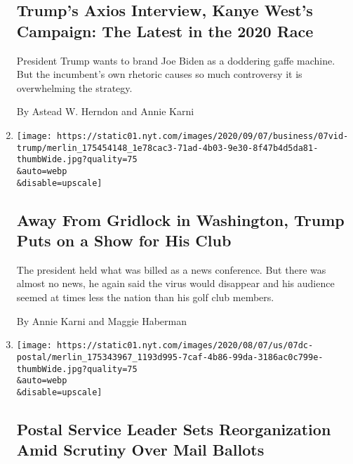 \begin{enumerate}
  \hypertarget{trumps-axios-interview-kanye-wests-campaign-the-latest-in-the-2020-race}{%
  \subsection{Trump's Axios Interview, Kanye West's Campaign: The Latest
  in the 2020
  Race}\label{trumps-axios-interview-kanye-wests-campaign-the-latest-in-the-2020-race}}

  President Trump wants to brand Joe Biden as a doddering gaffe machine.
  But the incumbent's own rhetoric causes so much controversy it is
  overwhelming the strategy.

  By Astead W. Herndon and Annie Karni
\item
  \href{/2020/08/07/us/politics/trump-news-conference-bedminster.html}{}

  \texttt{[image: https://static01.nyt.com/images/2020/09/07/business/07vid-trump/merlin\_175454148\_1e78cac3-71ad-4b03-9e30-8f47b4d5da81-thumbWide.jpg?quality=75\\\&auto=webp\\\&disable=upscale]}

  \hypertarget{away-from-gridlock-in-washington-trump-puts-on-a-show-for-his-club}{%
  \subsection{Away From Gridlock in Washington, Trump Puts on a Show for
  His
  Club}\label{away-from-gridlock-in-washington-trump-puts-on-a-show-for-his-club}}

  The president held what was billed as a news conference. But there was
  almost no news, he again said the virus would disappear and his
  audience seemed at times less the nation than his golf club members.

  By Annie Karni and Maggie Haberman
\item
  \href{/2020/08/07/us/politics/postal-service-reorganization-mail-ballots.html}{}

  \texttt{[image: https://static01.nyt.com/images/2020/08/07/us/07dc-postal/merlin\_175343967\_1193d995-7caf-4b86-99da-3186ac0c799e-thumbWide.jpg?quality=75\\\&auto=webp\\\&disable=upscale]}

  \hypertarget{postal-service-leader-sets-reorganization-amid-scrutiny-over-mail-ballots}{%
  \subsection{Postal Service Leader Sets Reorganization Amid Scrutiny
  Over Mail
  Ballots}\label{postal-service-leader-sets-reorganization-amid-scrutiny-over-mail-ballots}}


\end{enumerate}
